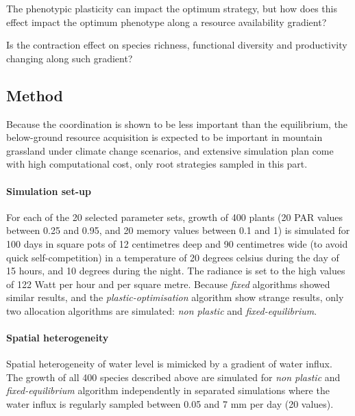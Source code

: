 The phenotypic plasticity can impact the optimum strategy, but how does this effect impact the optimum phenotype along a resource availability gradient?

Is the contraction effect on species richness, functional diversity and productivity changing along such gradient?

\subsection{Method}

Because the coordination is shown to be less important than the equilibrium, the below-ground resource acquisition is expected to be important in mountain grassland under climate change scenarios, and extensive simulation plan come with high computational cost, only root strategies sampled in this part.

\paragraph{Simulation set-up}
For each of the 20 selected parameter sets, growth of 400 plants (20 PAR values between 0.25 and 0.95, and 20 memory values between 0.1 and 1) is simulated for 100 days in square pots of 12 centimetres deep and 90 centimetres wide (to avoid quick self-competition) in a temperature of 20 degrees celsius during the day of 15 hours, and 10 degrees during the night. The radiance is set to the high values of 122 Watt per hour and per square metre. Because \textit{fixed} algorithms showed similar results, and the \textit{plastic-optimisation} algorithm show strange results, only two allocation algorithms are simulated: \textit{non plastic} and \textit{fixed-equilibrium}.

\paragraph{Spatial heterogeneity}
Spatial heterogeneity of water level is mimicked by a gradient of water influx. The growth of all 400 species described above are simulated for \textit{non plastic} and \textit{fixed-equilibrium} algorithm independently in separated simulations where the water influx is regularly sampled between 0.05 and 7 mm per day (20 values).

